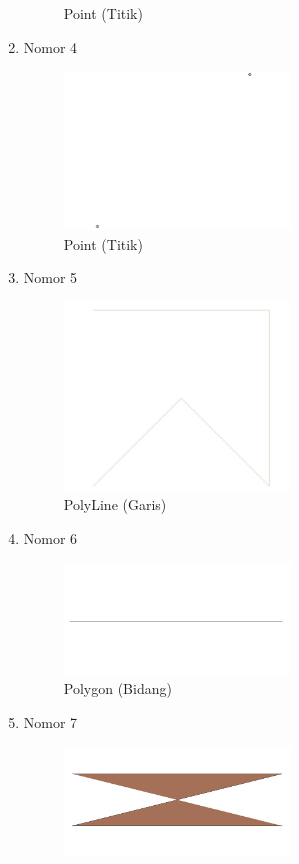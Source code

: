 \begin{enumerate}
\begin{figure}[H]
		\centering
		\caption{Point (Titik)}
	\end{figure}
	\item Nomor 4
	
	\begin{figure}[H]
		\includegraphics[width=6cm]{figures/Tugas2/1174087/no4.jpg}
		\centering
		\caption{Point (Titik)}
	\end{figure}
	\item Nomor 5
	
	\begin{figure}[H]
		\includegraphics[width=6cm]{figures/Tugas2/1174087/no5.jpg}
		\centering
		\caption{PolyLine (Garis)}
	\end{figure}
	\item Nomor 6
	
	\begin{figure}[H]
		\includegraphics[width=6cm]{figures/Tugas2/1174087/no6.jpg}
		\centering
		\caption{Polygon (Bidang)}
	\end{figure}
	\item Nomor 7
	
	\begin{figure}[H]
		\includegraphics[width=6cm]{figures/Tugas2/1174087/no7.jpg}

\end{figure}
\end{enumerate}
